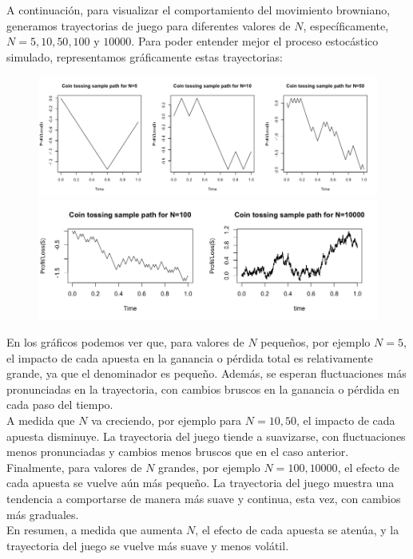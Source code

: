 \documentclass[a4paper,]{article}
\begin{document}
A continuación, para visualizar el comportamiento del movimiento browniano, generamos trayectorias de juego para diferentes valores de $N$, específicamente, $N = 5, 10, 50, 100 \mbox{ y } 10000$. Para poder entender mejor el proceso estocástico simulado, representamos gráficamente estas trayectorias:
\begin{figure}[H]
    \centering
    \includegraphics[scale=0.5]{plot1.png}
    \includegraphics[scale=0.5]{plot2.png}
\end{figure}

En los gráficos podemos ver que, para valores de $N$ pequeños, por ejemplo $N=5$, el impacto de cada apuesta en la ganancia o pérdida total es relativamente grande, ya que el denominador es pequeño. Además, se esperan fluctuaciones más pronunciadas en la trayectoria, con cambios bruscos en la ganancia o pérdida en cada paso del tiempo. \\

A medida que $N$ va creciendo, por ejemplo para $N=10, 50$, el impacto de cada apuesta disminuye. La trayectoria del juego tiende a suavizarse, con fluctuaciones menos pronunciadas y cambios menos bruscos que en el caso anterior. \\

Finalmente, para valores de $N$ grandes, por ejemplo $N=100,10000$, el efecto de cada apuesta se vuelve aún más pequeño. 
La trayectoria del juego muestra una tendencia a comportarse de manera más suave y continua, esta vez, con cambios más graduales. \\

En resumen, a medida que aumenta $N$, el efecto de cada apuesta se atenúa, y la trayectoria del juego se vuelve más suave y menos volátil. \\
\end{document}
